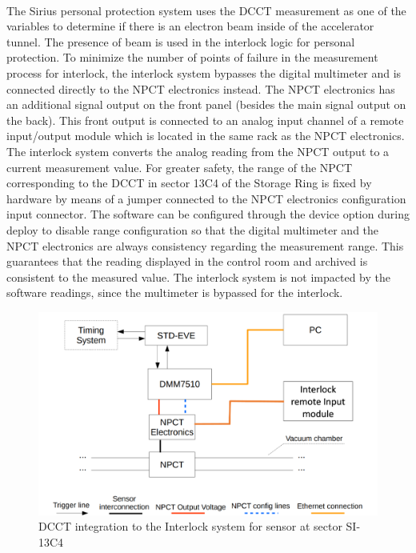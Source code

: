 \documentclass[openany]{article}
\begin{document}
	\paragraph{} The Sirius personal protection system uses the DCCT measurement as one of the variables to determine if there is an electron beam inside of the accelerator tunnel. The presence of beam is used in the interlock logic for personal protection. To minimize the number of points of failure in the measurement process for interlock, the interlock system bypasses the digital multimeter and is connected directly to the NPCT electronics instead. The NPCT electronics has an additional signal output on the front panel (besides the main signal output on the back). This front output is connected to an analog input channel of a remote input/output module which is located in the same rack as the NPCT electronics. The interlock system converts the analog reading from the NPCT output to a current measurement value. For greater safety, the range of the NPCT corresponding to the DCCT in sector 13C4 of the Storage Ring is fixed by hardware by means of a jumper connected to the NPCT electronics configuration input connector. The software can be configured through the device option during deploy to disable range configuration so that the digital multimeter and the NPCT electronics are always consistency regarding the measurement range. This guarantees that the reading displayed in the control room and archived is consistent to the measured value. The interlock system is not impacted by the software readings, since the multimeter is bypassed for the interlock.

	\begin{figure}[!h]
		\caption{DCCT integration to the Interlock system for sensor at sector SI-13C4}
		\label{fig:dcct-special-setup}
		\centering
		\includegraphics[width=1.0\textwidth]{dcct_interlock_13c4}
	\end{figure}
\FloatBarrier
\end{document}
